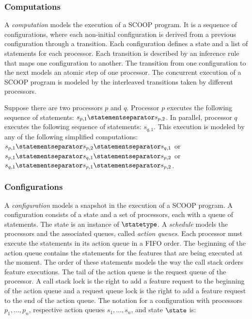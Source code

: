 \subsubsection{Computations}
A \emph{computation} models the execution of a SCOOP program. It is a sequence of configurations, where each non-initial configuration is derived from a previous configuration through a transition. Each configuration defines a state and a list of statements for each processor. Each transition is described by an inference rule that maps one configuration to another. The transition from one configuration to the next models an atomic step of one processor. The concurrent execution of a SCOOP program is modeled by the interleaved transitions taken by different processors.
\begin{example}
Suppose there are two processors $p$ and $q$. Processor $p$ executes the following sequence of statements: $s_{p, 1} \statementseparator s_{p, 2}$. In parallel, processor $q$ executes the following sequence of statements: $s_{q, 1}$. This execution is modeled by any of the following simplified computations: $s_{p, 1} \statementseparator s_{p, 2} \statementseparator s_{q, 1}$ or $s_{p, 1} \statementseparator s_{q, 1} \statementseparator s_{p, 2}$ or $s_{q, 1} \statementseparator s_{p, 1} \statementseparator s_{p, 2}$.
\end{example}

\subsubsection{Configurations}
A \emph{configuration} models a snapshot in the execution of a SCOOP program. A configuration consists of a state and a set of processors, each with a queue of statements. The state is an instance of $\statetype$. A \emph{schedule} models the processors and the associated queues, called \emph{action queues}. Each processor must execute the statements in its action queue in a FIFO order. The beginning of the action queue contains the statements for the features that are being executed at the moment. The order of these statements models the way the call stack orders feature executions. The tail of the action queue is the request queue of the processor. A call stack lock is the right to add a feature request to the beginning of the action queue and a request queue lock is the right to add a feature request to the end of the action queue. The notation for a configuration with processors $p_{1}, \ldots, p_{n}$, respective action queues $s_{1}, \ldots, s_{n}$, and state $\state$ is:

